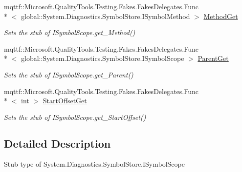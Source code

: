 \begin{DoxyCompactItemize}
mqttf\-::\-Microsoft.\-Quality\-Tools.\-Testing.\-Fakes.\-Fakes\-Delegates.\-Func\\*
$<$ global\-::\-System.\-Diagnostics.\-Symbol\-Store.\-I\-Symbol\-Method $>$ \hyperlink{class_system_1_1_diagnostics_1_1_symbol_store_1_1_fakes_1_1_stub_i_symbol_scope_a5de1d68c808390bf58f21ef6b7178a43}{Method\-Get}
\begin{DoxyCompactList}\small\item\em Sets the stub of I\-Symbol\-Scope.\-get\-\_\-\-Method()\end{DoxyCompactList}\item 
mqttf\-::\-Microsoft.\-Quality\-Tools.\-Testing.\-Fakes.\-Fakes\-Delegates.\-Func\\*
$<$ global\-::\-System.\-Diagnostics.\-Symbol\-Store.\-I\-Symbol\-Scope $>$ \hyperlink{class_system_1_1_diagnostics_1_1_symbol_store_1_1_fakes_1_1_stub_i_symbol_scope_a16cbc4c5fcd52262b8213d42044c5962}{Parent\-Get}
\begin{DoxyCompactList}\small\item\em Sets the stub of I\-Symbol\-Scope.\-get\-\_\-\-Parent()\end{DoxyCompactList}\item 
mqttf\-::\-Microsoft.\-Quality\-Tools.\-Testing.\-Fakes.\-Fakes\-Delegates.\-Func\\*
$<$ int $>$ \hyperlink{class_system_1_1_diagnostics_1_1_symbol_store_1_1_fakes_1_1_stub_i_symbol_scope_a6cc5e0b67f597328c12600ec4b7e2e5c}{Start\-Offset\-Get}
\begin{DoxyCompactList}\small\item\em Sets the stub of I\-Symbol\-Scope.\-get\-\_\-\-Start\-Offset()\end{DoxyCompactList}\end{DoxyCompactItemize}


\subsection{Detailed Description}
Stub type of System.\-Diagnostics.\-Symbol\-Store.\-I\-Symbol\-Scope



